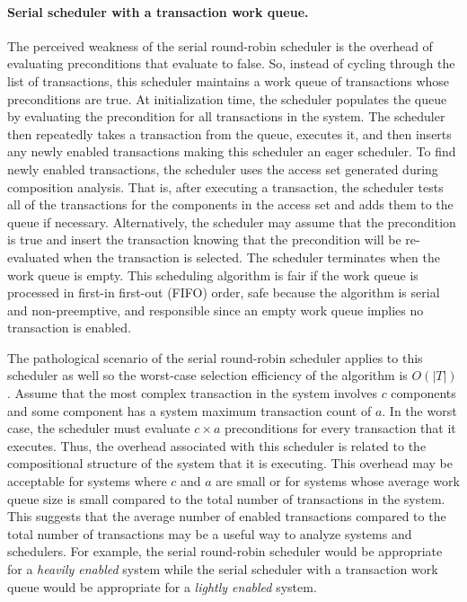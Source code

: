\paragraph{Serial scheduler with a transaction work queue.}
The perceived weakness of the serial round-robin scheduler is the overhead of evaluating preconditions that evaluate to false.
So, instead of cycling through the list of transactions, this scheduler maintains a work queue of transactions whose preconditions are true.
At initialization time, the scheduler populates the queue by evaluating the precondition for all transactions in the system.
The scheduler then repeatedly takes a transaction from the queue, executes it, and then inserts any newly enabled transactions making this scheduler an eager scheduler.
To find newly enabled transactions, the scheduler uses the access set generated during composition analysis.
That is, after executing a transaction, the scheduler tests all of the transactions for the components in the access set and adds them to the queue if necessary.
Alternatively, the scheduler may assume that the precondition is true and insert the transaction knowing that the precondition will be re-evaluated when the transaction is selected.
The scheduler terminates when the work queue is empty.
This scheduling algorithm is fair if the work queue is processed in first-in first-out (FIFO) order, safe because the algorithm is serial and non-preemptive, and responsible since an empty work queue implies no transaction is enabled.

The pathological scenario of the serial round-robin scheduler applies to this scheduler as well so the worst-case selection efficiency of the algorithm is $O(|T|)$.
Assume that the most complex transaction in the system involves $c$ components and some component has a system maximum transaction count of $a$.
In the worst case, the scheduler must evaluate $c \times a$ preconditions for every transaction that it executes.
Thus, the overhead associated with this scheduler is related to the compositional structure of the system that it is executing.
This overhead may be acceptable for systems where $c$ and $a$ are small or for systems whose average work queue size is small compared to the total number of transactions in the system.
This suggests that the average number of enabled transactions compared to the total number of transactions may be a useful way to analyze systems and schedulers.
For example, the serial round-robin scheduler would be appropriate for a \emph{heavily enabled} system while the serial scheduler with a transaction work queue would be appropriate for a \emph{lightly enabled} system.

